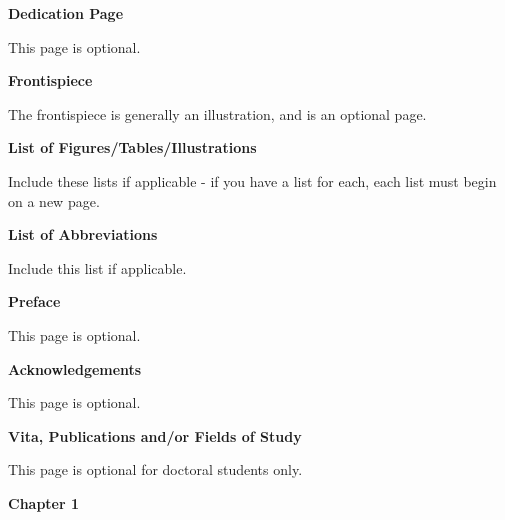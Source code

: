 \documentclass[12pt]{article}
\begin{document}
\newpage
\centerline{\bf{Dedication Page}}
\vspace*{4\baselineskip}
This page is optional.

\newpage
\centerline{\bf{Frontispiece}}
\vspace*{4\baselineskip}
The frontispiece is generally an illustration, and is an optional page.

\newpage


\newpage
\centerline{\bf{List of Figures/Tables/Illustrations}}
\vspace*{4\baselineskip}
Include these lists if applicable - if you have a list for each, each list must begin on a new page.

\newpage
\centerline{\bf{List of Abbreviations}}
\vspace*{4\baselineskip}
Include this list if applicable.

\newpage
\centerline{\bf{Preface}}
\vspace*{4\baselineskip}
This page is optional.

\newpage
\centerline{\bf{Acknowledgements}}
\vspace*{4\baselineskip}
This page is optional.

\newpage
\centerline{\bf{Vita, Publications and/or Fields of Study}}
\vspace*{4\baselineskip}
This page is optional for doctoral students only.

\newpage
{}
\centerline{\bf{Chapter 1}}
\end{document}
